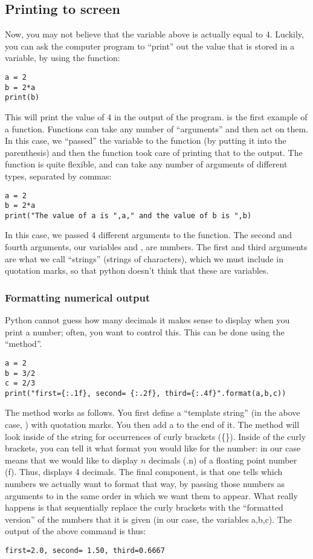\subsection{Printing to screen}
Now, you may not believe that the variable  above is actually equal to 4. Luckily, you can ask the computer program to ``print'' out the value that is stored in a variable, by using the  function:
\begin{lstlisting}[frame=single] 
a = 2 
b = 2*a
print(b)
\end{lstlisting}
This will print the value of 4 in the output of the program.  is the first example of a function. Functions can take any number of ``arguments'' and then act on them. In this case, we ``passed'' the variable  to the function  (by putting it into the parenthesis) and then the function took care of printing that to the output. The  function is quite flexible, and can take any number of arguments of different types, separated by commas:
\begin{lstlisting}[frame=single] 
a = 2 
b = 2*a
print("The value of a is ",a," and the value of b is ",b)
\end{lstlisting}
In this case, we passed 4 different arguments to the  function. The second and fourth arguments, our variables  and , are numbers. The first and third arguments are what we call ``strings'' (strings of characters), which we must include in quotation marks, so that python doesn't think that these are variables.

\subsubsection{Formatting numerical output}
Python cannot guess how many decimals it makes sense to display when you print a number; often, you want to control this. This can be done using the  ``method''.
\begin{lstlisting}[frame=single] 
a = 2 
b = 3/2
c = 2/3
print("first={:.1f}, second= {:.2f}, third={:.4f}".format(a,b,c))
\end{lstlisting}
The  method works as follows. You first define a ``template string'' (in the above case, ) with quotation marks. You then add a  to the end of it. The  method will look inside of the string for occurrences of curly brackets (\{\}). Inside of the curly brackets, you can tell it what format you would like for the number: in our case  means that we would like to display $n$ decimals (.n) of a floating point number (f). Thus,  displays 4 decimals. The final component, is that one tells  which numbers we actually want to format that way, by passing those numbers as arguments to  in the same order in which we want them to appear. What really happens is that  sequentially replace the curly brackets with the ``formatted version'' of the numbers that it is given (in our case, the variables a,b,c).
The output of the above command is thus:
\begin{verbatim}
first=2.0, second= 1.50, third=0.6667
\end{verbatim}

